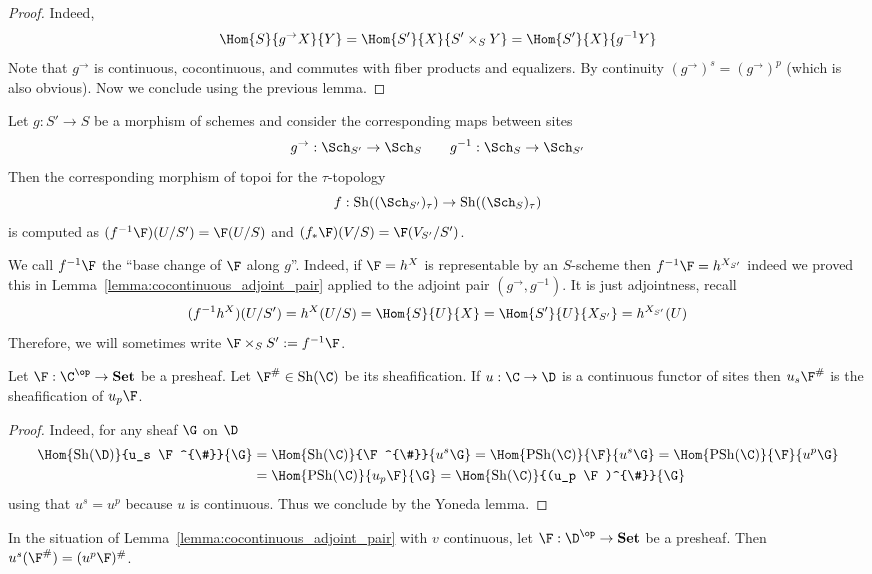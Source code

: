 \documentclass[12pt]{article}
\begin{document}
\begin{proof}
Indeed,
\[ \Hom{S}{g^{\to} X}{Y} = \Hom{S'}{X}{S' \times_S Y} = \Hom{S'}{X}{g^{-1} Y} \]
Note that $g^{\to}$ is continuous, cocontinuous, and commutes with fiber products and equalizers. By continuity $(g^{\to})^s = (g^{\to})^p$ (which is also obvious). Now we conclude using the previous lemma.
\end{proof}

\begin{cor}
Let $g : S' \to S$ be a morphism of schemes and consider the corresponding maps between sites
\[ g^{\to} : \Sch_{S'} \to \Sch_S \quad \quad g^{-1} : \Sch_{S} \to \Sch_{S'} \]
Then the corresponding morphism of topoi for the $\tau$-topology
\[ f : \Sh((\Sch_{S'})_{\tau}) \to \Sh((\Sch_{S})_{\tau}) \]
is computed as $(f^{-1} \F)(U/S') = \F(U/S)$ and $(f_* \F)(V/S) = \F(V_{S'}/S')$.
\end{cor}

\begin{rmk}
We call $f^{-1} \F$ the ``base change of $\F$ along $g$''. Indeed, if $\F = h^X$ is representable by an $S$-scheme then $f^{-1} \F = h^{X_{S'}}$ indeed we proved this in Lemma~\ref{lemma:cocontinuous_adjoint_pair} applied to the adjoint pair $(g^{\to}, g^{-1})$. It is just adjointness, recall
\[ (f^{-1} h^X)(U/S') = h^X(U/S) = \Hom{S}{U}{X} = \Hom{S'}{U}{X_{S'}} = h^{X_{S'}}(U) \]
Therefore, we will sometimes write $\F \times_S S' := f^{-1} \F$.
\end{rmk}

\begin{lemma}
Let $\F : \C^\op \to \Set$ be a presheaf. Let $\F^{\#} \in \Sh(\C)$ be its sheafification. If $u : \C \to \D$ is a continuous functor of sites then  $u_s \F^{\#}$ is the sheafification of $u_p \F$.
\end{lemma}

\begin{proof}
Indeed, for any sheaf $\G$ on $\D$
\begin{align*}
\Hom{\Sh(\D)}{u_s \F^{\#}}{\G} &= \Hom{\Sh(\C)}{\F^{\#}}{u^s \G} = \Hom{\PSh(\C)}{\F}{u^s \G} = \Hom{\PSh(\C)}{\F}{u^p \G}
\\
& = \Hom{\PSh(\C)}{u_p \F}{\G} = \Hom{\Sh(\C)}{(u_p \F)^{\#}}{\G} 
\end{align*}
using that $u^s = u^p$ because $u$ is continuous. Thus we conclude by the Yoneda lemma.
\end{proof}

\begin{lemma}
In the situation of Lemma~\ref{lemma:cocontinuous_adjoint_pair} with $v$ continuous, let $\F : \D^\op \to \Set$ be a presheaf. Then $u^s (\F^{\#}) = (u^p \F)^{\#}$. 
\end{lemma}
\end{document}
